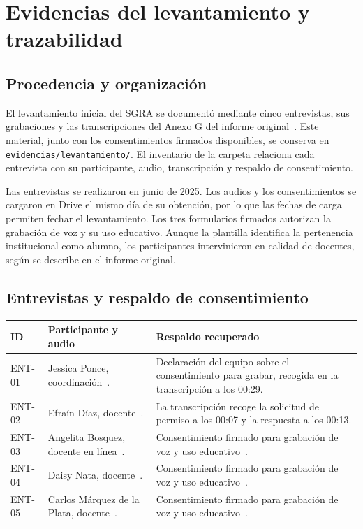 \section{Evidencias del levantamiento y trazabilidad}
\label{anexo:evidencias}

\subsection{Procedencia y organización}

El levantamiento inicial del SGRA se documentó mediante cinco entrevistas, sus grabaciones y las transcripciones del Anexo G del informe original~\cite{SGRA-documentacion-original}. Este material, junto con los consentimientos firmados disponibles, se conserva en \nolinkurl{evidencias/levantamiento/}. El inventario de la carpeta relaciona cada entrevista con su participante, audio, transcripción y respaldo de consentimiento.

Las entrevistas se realizaron en junio de 2025. Los audios y los consentimientos se cargaron en Drive el mismo día de su obtención, por lo que las fechas de carga permiten fechar el levantamiento. Los tres formularios firmados autorizan la grabación de voz y su uso educativo. Aunque la plantilla identifica la pertenencia institucional como alumno, los participantes intervinieron en calidad de docentes, según se describe en el informe original.

\subsection{Entrevistas y respaldo de consentimiento}

\begin{longtable}{@{}p{}p{}p{}@{}}
\toprule
\textbf{ID} & \textbf{Participante y audio} & \textbf{Respaldo recuperado}\\
\midrule
\endhead
ENT-01 & Jessica Ponce, coordinación~\cite{Ponce2025-Entrevista}. & Declaración del equipo sobre el consentimiento para grabar, recogida en la transcripción a los 00:29.\\
ENT-02 & Efraín Díaz, docente~\cite{Daz2025}. & La transcripción recoge la solicitud de permiso a los 00:07 y la respuesta a los 00:13.\\
ENT-03 & Angelita Bosquez, docente en línea~\cite{Bosquez2025}. & Consentimiento firmado para grabación de voz y uso educativo~\cite{consentimiento-bosquez}.\\
ENT-04 & Daisy Nata, docente~\cite{Nata2025}. & Consentimiento firmado para grabación de voz y uso educativo~\cite{consentimiento-nata}.\\
ENT-05 & Carlos Márquez de la Plata, docente~\cite{MarquezdelaPlataMontiel2025}. & Consentimiento firmado para grabación de voz y uso educativo~\cite{consentimiento-plata}.\\
\bottomrule
\end{longtable}

